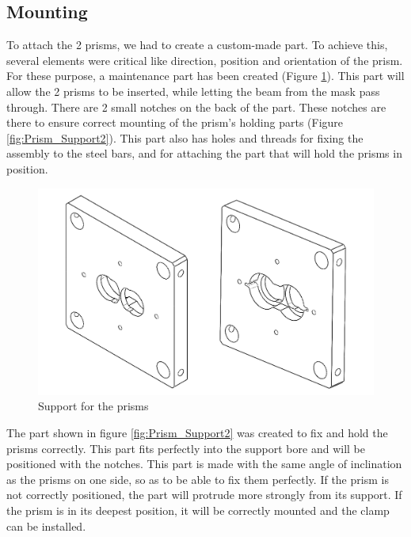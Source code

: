 \subsection{Mounting}
To attach the 2 prisms, we had to create a custom-made part. To achieve this, several elements were critical 
like direction, position and orientation of the prism.
\bigbreak
For these purpose, a maintenance part has been created (Figure \ref{fig:Prism_Support1}). This part will allow the 2 prisms to be inserted, while letting 
the beam from the mask pass through. \newline
There are 2 small notches on the back of the part. These notches are there to ensure correct mounting of the prism's 
holding parts (Figure \ref{fig:Prism_Support2}).\newline
This part also has holes and threads for fixing the assembly to the steel bars, and for attaching the part that 
will hold the prisms in position. 
\begin{figure}[H]
    \centering
    \includegraphics[scale=0.55]{assets/figures/Mechanical Design/MaintientPrism1.png}
    \caption{Support for the prisms}
    \label{fig:Prism_Support1}
\end{figure}
The part shown in figure \ref{fig:Prism_Support2} was created to fix and hold the prisms correctly. This part fits perfectly into the support 
bore and will be positioned with the notches. \newline 
This part is made with the same angle of inclination as the prisms on one side, so as to be able to fix them perfectly. 
If the prism is not correctly positioned, the part will protrude more strongly from its support. If the prism is in its 
deepest position, it will be correctly mounted and the clamp can be installed.\newline
